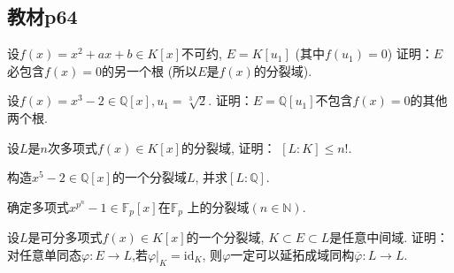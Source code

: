 \subsection{教材p64}

\begin{problem}
    设$f(x) = x^2 + ax + b \in K[x]$不可约, $E = K[u_1]$
(其中$f(u_1) = 0$) 证明：$E$必包含$f(x) = 0$的另一个根
(所以$E$是$f(x)$的分裂域).
\end{problem}

\begin{solution}
    
\end{solution}

\begin{problem}
    设$f(x) = x^3 - 2 \in \mathbb{Q}[x], u_1 = \sqrt[3]{2}$.
证明：$E = \mathbb{Q}[u_1]$不包含$f(x) = 0$的其他两个根.
\end{problem}

\begin{solution}
    
\end{solution}

\begin{problem}
    设$L$是$n$次多项式$f(x) \in K[x]$的分裂域, 证明：
$[L:K] \leqslant n!$.
\end{problem}

\begin{solution}
    
\end{solution}

\begin{problem}
    构造$x^5 - 2 \in \mathbb{Q}[x]$的一个分裂域$L$,
并求$[L:\mathbb{Q}]$.
\end{problem}

\begin{solution}
    
\end{solution}

\begin{problem}
    确定多项式$x^{p^n} - 1 \in \mathbb{F}_p[x]$在$\mathbb{F}_p$
上的分裂域$(n \in \mathbb{N})$.
\end{problem}

\begin{solution}
    
\end{solution}

\begin{problem}
    设$L$是可分多项式$f(x) \in K[x]$的一个分裂域, $K \subset E \subset L$是任意中间域.
证明：对任意单同态$\varphi:E \to L$,若$\varphi|_K = \mathrm{id}_K$,
则$\varphi$一定可以延拓成域同构$\overline\varphi:L \to L$.
\end{problem}

